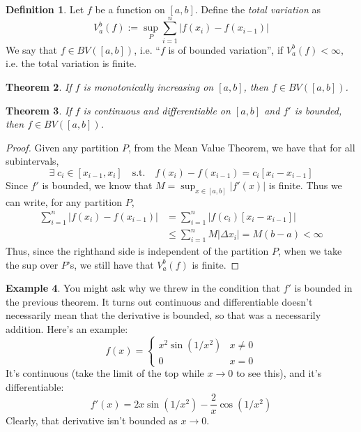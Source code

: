 \documentclass[12pt]{article}
\theoremstyle{plain}
\newtheorem{thm}{Theorem}[subsection]
\theoremstyle{definition}
\newtheorem{defn}[thm]{Definition}
\newtheorem{ex}[thm]{Example}
\theoremstyle{remark}
\begin{document}
\begin{defn}
Let $f$ be a function on $[a,b]$. Define the \emph{total variation} as
\[ V_a^b(f) := \sup_P \sum^n_{i=1} \left\lvert f(x_i) - f(x_{i-1})
    \right\rvert \]
We say that $f \in BV([a,b])$, i.e. ``$f$ is of bounded variation'', if $V^b_a(f)<\infty$, i.e. the total variation is finite.
\end{defn}

\begin{thm}
If $f$ is monotonically increasing on $[a,b]$, then $f\in BV([a,b])$.
\end{thm}

\begin{thm}
If $f$ is continuous and differentiable on $[a,b]$ and $f'$ is bounded, then $f\in BV([a,b])$.
\end{thm}
\begin{proof}
Given any partition $P$, from the Mean Value Theorem, we have that for all subintervals, 
    \[ \exists\; c_i \in [x_{i-1}, x_i] \quad \text{s.t.}
        \quad f(x_i) - f(x_{i-1}) = c_i \left[
        x_i - x_{i-1}\right]    \]
Since $f'$ is bounded, we know that $M=\sup_{x\in[a,b]} |f'(x)|$ is finite. Thus we can write, for any partition $P$,
\begin{align*}
    \sum^n_{i=1} \left\lvert f(x_i) - f(x_{i-1})
        \right\rvert &= \sum^n_{i=1} \left\lvert f(c_i) 
        \left[x_i - x_{i-1}\right] \right\rvert \\
    &\leq \sum^n_{i=1} M \left\lvert \Delta x_i 
        \right\rvert = M(b-a) < \infty 
\end{align*}
Thus, since the righthand side is independent of the partition $P$, when we take the sup over $P$'s, we still have that $V_a^b(f)$ is finite.
\end{proof}

\begin{ex}
You might ask why we threw in the condition that $f'$ is bounded in the previous theorem.  It turns out continuous and differentiable doesn't necessarily mean that the derivative is bounded, so that was a necessarily addition.  Here's an example:
    \[ f(x) =
        \begin{cases} 
            x^2 \sin(1/x^2) & x \neq 0\\
            0               & x = 0
        \end{cases}  \]
It's continuous (take the limit of the top while $x\rightarrow 0$ to see this), and it's differentiable:
    \[ f'(x) = 2x \sin(1/x^2) - \frac{2}{x} \cos(1/x^2) \]
Clearly, that derivative isn't bounded as $x\rightarrow 0$.
\end{ex}
\end{document}
